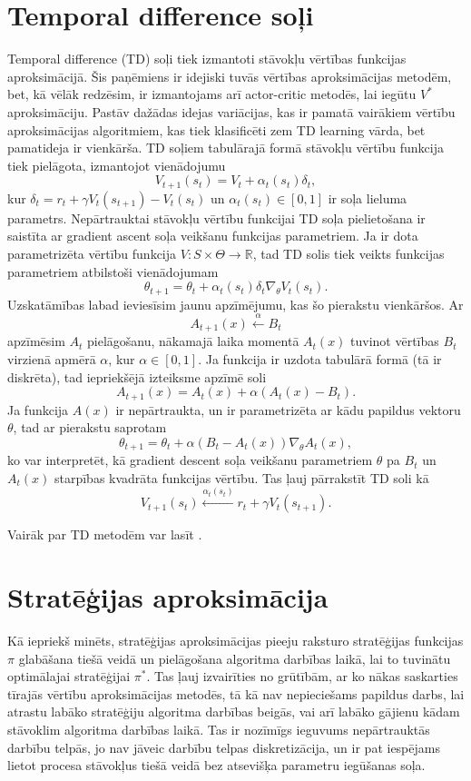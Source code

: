 \documentclass{ludis} %
\begin{document}
\section{Temporal difference soļi} \label{chap:td}
Temporal difference (TD) soļi tiek izmantoti stāvokļu vērtības funkcijas aproksimācijā.
Šis paņēmiens ir idejiski tuvās vērtības aproksimācijas metodēm, bet, kā vēlāk redzēsim, ir izmantojams arī actor-critic metodēs, lai iegūtu $V^*$ aproksimāciju.
Pastāv dažādas idejas variācijas, kas ir pamatā vairākiem vērtību aproksimācijas algoritmiem, kas tiek klasificēti zem TD learning vārda, bet pamatideja ir vienkārša.
TD soļiem tabulārajā formā stāvokļu vērtību funkcija tiek pielāgota, izmantojot vienādojumu
\[
	V_{t+1}(s_t) = V_t + \alpha_t(s_t) \delta_t,
\]
kur $\delta_t = r_{t} + \gamma V_t(s_{t + 1}) - V_t(s_t)$ un $\alpha_t(s_t) \in [0,1]$ ir soļa lieluma parametrs.
Nepārtrauktai stāvokļu vērtību funkcijai TD soļa pielietošana ir saistīta ar gradient ascent soļa veikšanu funkcijas parametriem.
Ja ir dota parametrizēta vērtību funkcija $V:S \times \Theta \rightarrow \mathbb{R}$, tad TD solis tiek veikts funkcijas parametriem atbilstoši vienādojumam
\[
	\theta_{t+1} = \theta_t + \alpha_t(s_t) \delta_t \nabla_\theta V_t(s_t).
\]
Uzskatāmības labad ieviesīsim jaunu apzīmējumu, kas šo pierakstu vienkāršos.
Ar
\[
	A_{t+1}(x) \xleftarrow{\alpha} B_t
\]
apzīmēsim $A_t$ pielāgošanu, nākamajā laika momentā $A_t(x)$ tuvinot vērtības $B_t$ virzienā apmērā $\alpha$, kur $\alpha \in [0,1]$.
Ja funkcija ir uzdota tabulārā formā (tā ir diskrēta), tad iepriekšējā izteiksme apzīmē soli
\[
	A_{t+1}(x) = A_t(x) + \alpha(A_t(x) - B_t).
\]
Ja funkcija $A(x)$ ir nepārtraukta, un ir parametrizēta ar kādu papildus vektoru $\theta$, tad ar pierakstu saprotam
\[
	\theta_{t+1} = \theta_t + \alpha \left(B_t - A_t(x)\right) \nabla_\theta A_t(x),
\]
ko var interpretēt, kā gradient descent soļa veikšanu parametriem $\theta$ pa $B_t$ un $A_t(x)$ starpības kvadrāta funkcijas vērtību.
Tas ļauj pārrakstīt TD soli kā
\[
	V_{t+1}(s_t) \xleftarrow{\alpha_t(s_t)} r_t + \gamma V_t(s_{t + 1}).
\]

Vairāk par TD metodēm var lasīt \autocite{Hasselt2012}.

\section{Stratēģijas aproksimācija}
Kā iepriekš minēts, stratēģijas aproksimācijas pieeju raksturo stratēģijas funkcijas $\pi$ glabāšana tiešā veidā un pielāgošana algoritma darbības laikā, lai to tuvinātu optimālajai stratēģijai $\pi^*$.
Tas ļauj izvairīties no grūtībām, ar ko nākas saskarties tīrajās vērtību aproksimācijas metodēs, tā kā nav nepieciešams papildus darbs, lai atrastu labāko stratēģiju algoritma darbības beigās, vai arī labāko gājienu kādam stāvoklim algoritma darbības laikā.
Tas ir nozīmīgs ieguvums nepārtrauktās darbību telpās, jo nav jāveic darbību telpas diskretizācija, un ir pat iespējams lietot procesa stāvokļus tiešā veidā bez atsevišķa parametru iegūšanas soļa.
\end{document}
